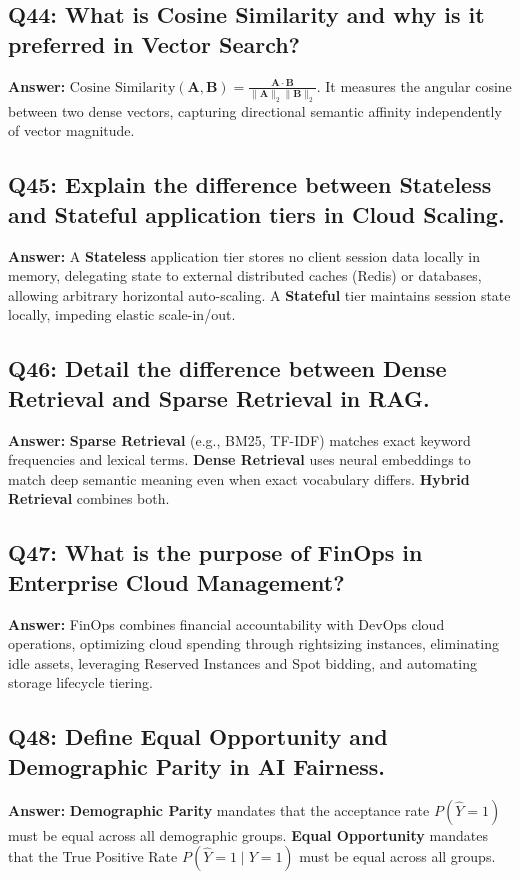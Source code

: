 \subsection*{Q44: What is Cosine Similarity and why is it preferred in Vector Search?}
\textbf{Answer:} $\text{Cosine Similarity}(\mathbf{A}, \mathbf{B}) = \frac{\mathbf{A} \cdot \mathbf{B}}{\|\mathbf{A}\|_2 \|\mathbf{B}\|_2}$. It measures the angular cosine between two dense vectors, capturing directional semantic affinity independently of vector magnitude.

\subsection*{Q45: Explain the difference between Stateless and Stateful application tiers in Cloud Scaling.}
\textbf{Answer:} A \textbf{Stateless} application tier stores no client session data locally in memory, delegating state to external distributed caches (Redis) or databases, allowing arbitrary horizontal auto-scaling. A \textbf{Stateful} tier maintains session state locally, impeding elastic scale-in/out.

\subsection*{Q46: Detail the difference between Dense Retrieval and Sparse Retrieval in RAG.}
\textbf{Answer:} \textbf{Sparse Retrieval} (e.g., BM25, TF-IDF) matches exact keyword frequencies and lexical terms. \textbf{Dense Retrieval} uses neural embeddings to match deep semantic meaning even when exact vocabulary differs. \textbf{Hybrid Retrieval} combines both.

\subsection*{Q47: What is the purpose of FinOps in Enterprise Cloud Management?}
\textbf{Answer:} FinOps combines financial accountability with DevOps cloud operations, optimizing cloud spending through rightsizing instances, eliminating idle assets, leveraging Reserved Instances and Spot bidding, and automating storage lifecycle tiering.

\subsection*{Q48: Define Equal Opportunity and Demographic Parity in AI Fairness.}
\textbf{Answer:} \textbf{Demographic Parity} mandates that the acceptance rate $P(\hat{Y}=1)$ must be equal across all demographic groups. \textbf{Equal Opportunity} mandates that the True Positive Rate $P(\hat{Y}=1 \mid Y=1)$ must be equal across all groups.

